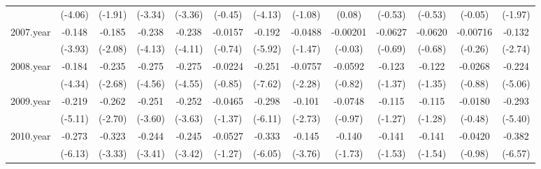 {\begin{tabular}{l*{12}{c}}
            &     (-4.06)         &     (-1.91)         &     (-3.34)         &     (-3.36)         &     (-0.45)         &     (-4.13)         &     (-1.08)         &      (0.08)         &     (-0.53)         &     (-0.53)         &     (-0.05)         &     (-1.97)         \\
[1em]
2007.year   &      -0.148\sym{***}&      -0.185\sym{*}  &      -0.238\sym{***}&      -0.238\sym{***}&     -0.0157         &      -0.192\sym{***}&     -0.0488         &    -0.00201         &     -0.0627         &     -0.0620         &    -0.00716         &      -0.132\sym{**} \\
            &     (-3.93)         &     (-2.08)         &     (-4.13)         &     (-4.11)         &     (-0.74)         &     (-5.92)         &     (-1.47)         &     (-0.03)         &     (-0.69)         &     (-0.68)         &     (-0.26)         &     (-2.74)         \\
[1em]
2008.year   &      -0.184\sym{***}&      -0.235\sym{*}  &      -0.275\sym{***}&      -0.275\sym{***}&     -0.0224         &      -0.251\sym{***}&     -0.0757\sym{*}  &     -0.0592         &      -0.123         &      -0.122         &     -0.0268         &      -0.224\sym{***}\\
            &     (-4.34)         &     (-2.68)         &     (-4.56)         &     (-4.55)         &     (-0.85)         &     (-7.62)         &     (-2.28)         &     (-0.82)         &     (-1.37)         &     (-1.35)         &     (-0.88)         &     (-5.06)         \\
[1em]
2009.year   &      -0.219\sym{***}&      -0.262\sym{**} &      -0.251\sym{***}&      -0.252\sym{***}&     -0.0465         &      -0.298\sym{***}&      -0.101\sym{**} &     -0.0748         &      -0.115         &      -0.115         &     -0.0180         &      -0.293\sym{***}\\
            &     (-5.11)         &     (-2.70)         &     (-3.60)         &     (-3.63)         &     (-1.37)         &     (-6.11)         &     (-2.73)         &     (-0.97)         &     (-1.27)         &     (-1.28)         &     (-0.48)         &     (-5.40)         \\
[1em]
2010.year   &      -0.273\sym{***}&      -0.323\sym{**} &      -0.244\sym{**} &      -0.245\sym{**} &     -0.0527         &      -0.333\sym{***}&      -0.145\sym{***}&      -0.140         &      -0.141         &      -0.141         &     -0.0420         &      -0.382\sym{***}\\
            &     (-6.13)         &     (-3.33)         &     (-3.41)         &     (-3.42)         &     (-1.27)         &     (-6.05)         &     (-3.76)         &     (-1.73)         &     (-1.53)         &     (-1.54)         &     (-0.98)         &     (-6.57)         \\

\end{tabular}}
